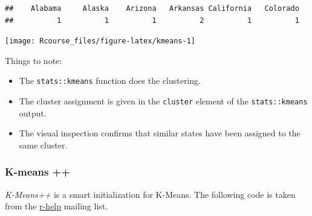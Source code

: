 \documentclass[]{book}
\newenvironment{Shaded}{\begin{snugshade}}{\end{snugshade}}
\newcommand{\KeywordTok}[1]{\textcolor[rgb]{0.13,0.29,0.53}{\textbf{{#1}}}}
\newcommand{\DataTypeTok}[1]{\textcolor[rgb]{0.13,0.29,0.53}{{#1}}}
\newcommand{\FloatTok}[1]{\textcolor[rgb]{0.00,0.00,0.81}{{#1}}}
\newcommand{\CommentTok}[1]{\textcolor[rgb]{0.56,0.35,0.01}{\textit{{#1}}}}
\newcommand{\NormalTok}[1]{{#1}}
\providecommand{\tightlist}{%
  \setlength{\itemsep}{0pt}\setlength{\parskip}{0pt}}
\theoremstyle{definition}
\theoremstyle{definition}
\theoremstyle{remark}
\begin{document}
\begin{verbatim}
##    Alabama     Alaska    Arizona   Arkansas California   Colorado 
##          1          1          1          2          1          1
\end{verbatim}

\begin{Shaded}
\end{Shaded}

\texttt{[image: Rcourse\_files/figure-latex/kmeans-1]}

Things to note:

\begin{itemize}
\tightlist
\item
  The \texttt{stats::kmeans} function does the clustering.
\item
  The cluster assignment is given in the \texttt{cluster} element of the
  \texttt{stats::kmeans} output.
\item
  The visual inspection confirms that similar states have been assigned
  to the same cluster.
\end{itemize}

\subsubsection{K-means ++}\label{k-means-3}

\emph{K-Means++} is a smart initialization for K-Means. The following
code is taken from the
\href{https://stat.ethz.ch/pipermail/r-help/2012-January/300051.html}{r-help}
mailing list.
\end{document}
